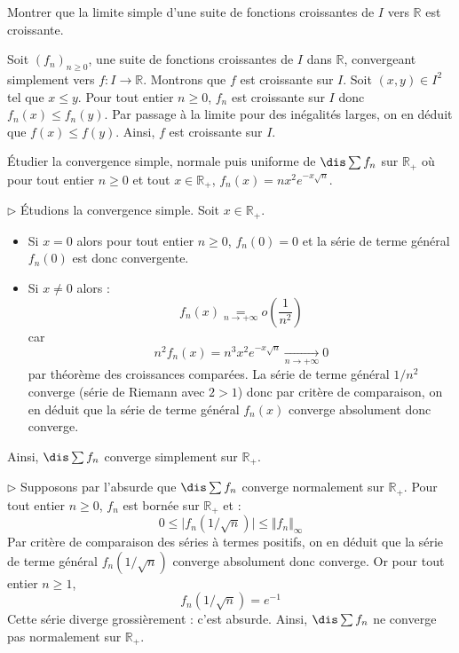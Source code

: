 \documentclass[a4paper,10pt]{report}
\begin{document}
\begin{Exa} Montrer que la limite simple d'une suite de fonctions croissantes de $I$ vers $\mathbb{R}$ est croissante.
\end{Exa}

\corr Soit $(f_n)_{n \geq 0}$, une suite de fonctions croissantes de $I$ dans $\mathbb{R}$, convergeant simplement vers $f : I \rightarrow \mathbb{R}$. Montrons que $f$ est croissante sur $I$. Soit $(x,y) \in I^2$ tel que $x \leq y$. Pour tout entier $n \geq 0$, $f_n$ est croissante sur $I$ donc $f_n(x) \leq f_n(y)$. Par passage à la limite pour des inégalités larges, on en déduit que $f(x) \leq f(y)$. Ainsi, $f$ est croissante sur $I$.


\begin{Exa} Étudier la convergence simple, normale puis uniforme de $\dis \sum f_n$ sur $\mathbb{R}_+$ où pour tout entier $n \geq 0$ et tout $x \in \mathbb{R}_+$, $f_n(x) = nx^2e^{-x\sqrt{n}}.$
\end{Exa} 

\corr 

\noindent $\rhd$ Étudions la convergence simple. Soit $x \in \mathbb{R}_+$.

\begin{itemize}
\item Si $x=0$ alors pour tout entier $n \geq 0$, $f_n(0)=0$ et la série de terme général $f_n(0)$ est donc convergente.
\item Si $x \neq 0$ alors :
$$ f_n(x) \underset{n \rightarrow + \infty}{=} o \left( \dfrac{1}{n^2} \right)$$
car 
$$ n^2f_n(x) = n^3x^2e^{-x\sqrt{n}} \underset{n \rightarrow + \infty}{\longrightarrow} 0$$
par théorème des croissances comparées. La série de terme général $1/n^2$ converge (série de Riemann avec $2>1$) donc par critère de comparaison, on en déduit que la série de terme général $f_n(x)$ converge absolument donc converge.
\end{itemize}
Ainsi, $\dis \sum f_n$ converge simplement sur $\mathbb{R}_+$.

\medskip

\noindent $\rhd$ Supposons par l'absurde que $\dis \sum f_n$ converge normalement sur $\mathbb{R}_+$. Pour tout entier $n \geq 0$, $f_n$ est bornée sur $\mathbb{R}_+$ et :
$$ 0 \leq \vert f_n(1/\sqrt{n}) \vert \leq \Vert f_n \Vert_{\infty}$$
Par critère de comparaison des séries à termes positifs, on en déduit que la série de terme général $f_n(1/\sqrt{n})$ converge absolument donc converge. Or pour tout entier $n \geq 1$,
 $$ f_n(1/\sqrt{n}) = e^{-1}$$
Cette série diverge grossièrement : c'est absurde. Ainsi, $\dis \sum f_n$ ne converge pas normalement sur $\mathbb{R}_+$.
\end{document}
